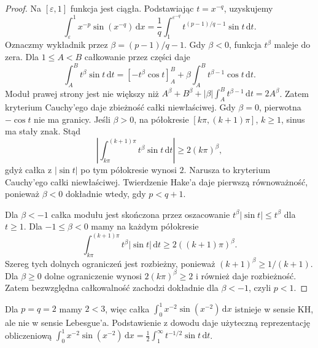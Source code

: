 \begin{proof}
Na $[\varepsilon,1]$ funkcja jest ciągła. Podstawiając $t=x^{-q}$, uzyskujemy
\[
\int_\varepsilon^1x^{-p}\sin(x^{-q})\,\mathrm dx
=\frac1q\int_1^{\varepsilon^{-q}}t^{(p-1)/q-1}\sin t\,\mathrm dt.
\]
Oznaczmy wykładnik przez $\beta=(p-1)/q-1$. Gdy $\beta<0$, funkcja $t^\beta$ maleje do zera. Dla $1\le A<B$ całkowanie przez części daje
\[
\int_A^B t^\beta\sin t\,\mathrm dt
=[-t^\beta\cos t]_A^B+\beta\int_A^B t^{\beta-1}\cos t\,\mathrm dt.
\]
Moduł prawej strony jest nie większy niż $A^\beta+B^\beta+|\beta|\int_A^B t^{\beta-1}\,\mathrm dt=2A^\beta$. Zatem kryterium Cauchy'ego daje zbieżność całki niewłaściwej. Gdy $\beta=0$, pierwotna $-\cos t$ nie ma granicy. Jeśli $\beta>0$, na półokresie $[k\pi,(k+1)\pi]$, $k\ge1$, sinus ma stały znak. Stąd
\[
 \left|\int_{k\pi}^{(k+1)\pi}t^\beta\sin t\,\mathrm dt\right|
 \ge 2(k\pi)^\beta,
\]
gdyż całka z $|\sin t|$ po tym półokresie wynosi $2$. Narusza to kryterium Cauchy'ego całki niewłaściwej. Twierdzenie Hake'a daje pierwszą równoważność, ponieważ $\beta<0$ dokładnie wtedy, gdy $p<q+1$.

Dla $\beta<-1$ całka modułu jest skończona przez oszacowanie $t^\beta|\sin t|\le t^\beta$ dla $t\ge1$. Dla $-1\le\beta<0$ mamy na każdym półokresie
\[
 \int_{k\pi}^{(k+1)\pi}t^\beta|\sin t|\,\mathrm dt
 \ge 2((k+1)\pi)^\beta.
\]
Szereg tych dolnych ograniczeń jest rozbieżny, ponieważ $(k+1)^\beta\ge 1/(k+1)$. Dla $\beta\ge0$ dolne ograniczenie wynosi $2(k\pi)^\beta\ge2$ i również daje rozbieżność. Zatem bezwzględna całkowalność zachodzi dokładnie dla $\beta<-1$, czyli $p<1$.
\end{proof}
\begin{przyklad}
Dla $p=q=2$ mamy $2<3$, więc całka $\int_0^1x^{-2}\sin(x^{-2})\,\mathrm dx$ istnieje w sensie KH, ale nie w sensie Lebesgue'a. Podstawienie z dowodu daje użyteczną reprezentację obliczeniową
$\int_0^1x^{-2}\sin(x^{-2})\,\mathrm dx=\tfrac12\int_1^\infty t^{-1/2}\sin t\,\mathrm dt$.
\end{przyklad}
\endgroup
